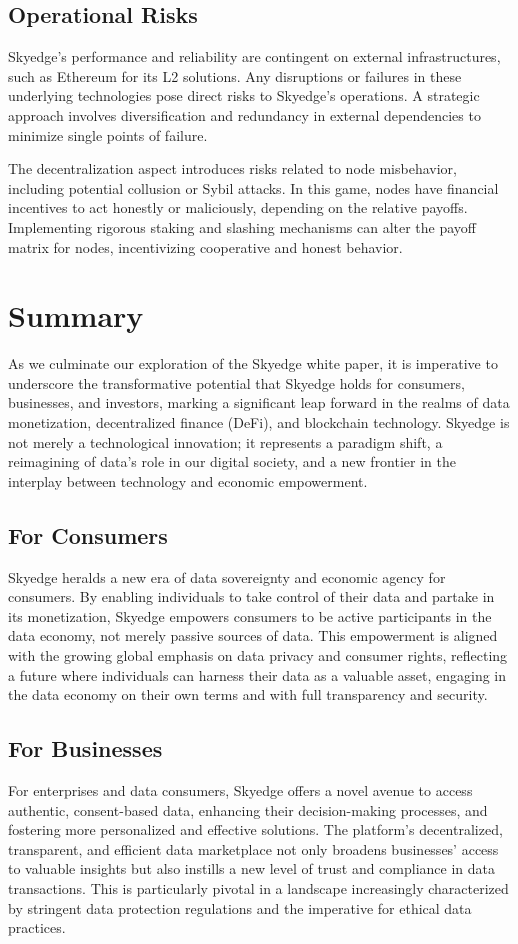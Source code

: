 \documentclass{article}
\begin{document}
\subsection{Operational Risks}
Skyedge's performance and reliability are contingent on external infrastructures, such as Ethereum for its L2 solutions. Any disruptions or failures in these underlying technologies pose direct risks to Skyedge's operations. A strategic approach involves diversification and redundancy in external dependencies to minimize single points of failure.

The decentralization aspect introduces risks related to node misbehavior, including potential collusion or Sybil attacks. In this game, nodes have financial incentives to act honestly or maliciously, depending on the relative payoffs. Implementing rigorous staking and slashing mechanisms can alter the payoff matrix for nodes, incentivizing cooperative and honest behavior.

\pagebreak

\section{Summary}
As we culminate our exploration of the Skyedge white paper, it is imperative to underscore the transformative potential that Skyedge holds for consumers, businesses, and investors, marking a significant leap forward in the realms of data monetization, decentralized finance (DeFi), and blockchain technology. Skyedge is not merely a technological innovation; it represents a paradigm shift, a reimagining of data's role in our digital society, and a new frontier in the interplay between technology and economic empowerment.

\subsection*{For Consumers}
Skyedge heralds a new era of data sovereignty and economic agency for consumers. By enabling individuals to take control of their data and partake in its monetization, Skyedge empowers consumers to be active participants in the data economy, not merely passive sources of data. This empowerment is aligned with the growing global emphasis on data privacy and consumer rights, reflecting a future where individuals can harness their data as a valuable asset, engaging in the data economy on their own terms and with full transparency and security.

\subsection*{For Businesses}
For enterprises and data consumers, Skyedge offers a novel avenue to access authentic, consent-based data, enhancing their decision-making processes, and fostering more personalized and effective solutions. The platform's decentralized, transparent, and efficient data marketplace not only broadens businesses' access to valuable insights but also instills a new level of trust and compliance in data transactions. This is particularly pivotal in a landscape increasingly characterized by stringent data protection regulations and the imperative for ethical data practices.
\end{document}
